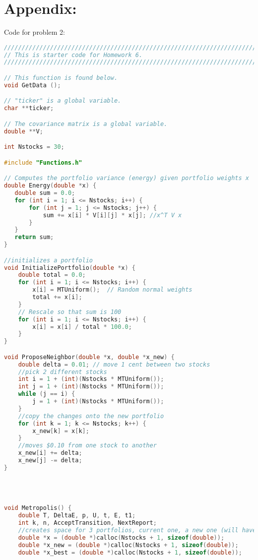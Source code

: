 \documentclass{report}
\begin{document}
\setcounter{page}{10}
\section*{Appendix:}

Code for problem 2:
\begin{lstlisting}[language=C++]
////////////////////////////////////////////////////////////////////////////////
// This is starter code for Homework 6.
////////////////////////////////////////////////////////////////////////////////

// This function is found below.
void GetData ();

// "ticker" is a global variable.
char **ticker;

// The covariance matrix is a global variable.
double **V;

int Nstocks = 30;

#include "Functions.h"

// Computes the portfolio variance (energy) given portfolio weights x
double Energy(double *x) {
   double sum = 0.0;
   for (int i = 1; i <= Nstocks; i++) {
       for (int j = 1; j <= Nstocks; j++) {
           sum += x[i] * V[i][j] * x[j]; //x^T V x
       }
   }
   return sum;
}

//initializes a portfolio
void InitializePortfolio(double *x) {
    double total = 0.0;
    for (int i = 1; i <= Nstocks; i++) {
        x[i] = MTUniform();  // Random normal weights
        total += x[i];
    }
    // Rescale so that sum is 100
    for (int i = 1; i <= Nstocks; i++) {
        x[i] = x[i] / total * 100.0;
    }
}

void ProposeNeighbor(double *x, double *x_new) {
    double delta = 0.01; // move 1 cent between two stocks
    //pick 2 different stocks
    int i = 1 + (int)(Nstocks * MTUniform());
    int j = 1 + (int)(Nstocks * MTUniform());
    while (j == i) {
        j = 1 + (int)(Nstocks * MTUniform());
    }
    //copy the changes onto the new portfolio
    for (int k = 1; k <= Nstocks; k++) {
        x_new[k] = x[k];
    }
    //moves $0.10 from one stock to another
    x_new[i] += delta;
    x_new[j] -= delta;
}




void Metropolis() {
    double T, DeltaE, p, U, t, E, t1;
    int k, n, AcceptTransition, NextReport;
    //creates space for 3 portfolios, current one, a new one (will have changes), and the lowest variance (best) one
    double *x = (double *)calloc(Nstocks + 1, sizeof(double));
    double *x_new = (double *)calloc(Nstocks + 1, sizeof(double));
    double *x_best = (double *)calloc(Nstocks + 1, sizeof(double));


\end{lstlisting}
\end{document}
